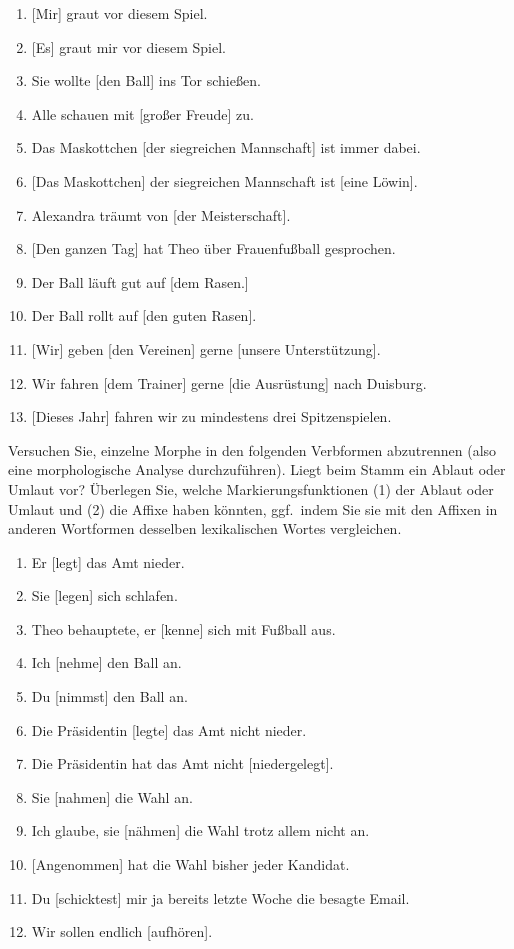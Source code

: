\begin{enumerate}\Lf
  \item {[Mir]} graut vor diesem Spiel.
  \item {[Es]} graut mir vor diesem Spiel.
  \item Sie wollte {[den Ball]} ins Tor schießen.
  \item Alle schauen mit {[großer Freude]} zu.
  \item Das Maskottchen {[der siegreichen Mannschaft]} ist immer dabei.
  \item {[Das Maskottchen]} der siegreichen Mannschaft ist {[eine Löwin]}.
  \item Alexandra träumt von {[der Meisterschaft]}.
  \item {[Den ganzen Tag]} hat Theo über Frauenfußball gesprochen.
  \item Der Ball läuft gut auf {[dem Rasen.]}
  \item Der Ball rollt auf {[den guten Rasen]}.
  \item {[Wir]} geben {[den Vereinen]} gerne {[unsere Unterstützung]}.
  \item Wir fahren {[dem Trainer]} gerne {[die Ausrüstung]} nach Duisburg.
  \item {[Dieses Jahr]} fahren wir zu mindestens drei Spitzenspielen.
\end{enumerate}

\Uebung[\tristar] \label{u62} Versuchen Sie, einzelne Morphe in den folgenden Verbformen abzutrennen (also eine morphologische Analyse durchzuführen).
Liegt beim Stamm ein Ablaut oder Umlaut vor?
Überlegen Sie, welche Markierungsfunktionen (1) der Ablaut oder Umlaut und (2) die Affixe haben könnten, ggf.\ indem Sie sie mit den Affixen in anderen Wortformen desselben lexikalischen Wortes vergleichen.

\begin{enumerate}\Lf
  \item Er {[legt]} das Amt nieder.
  \item Sie {[legen]} sich schlafen.
  \item Theo behauptete, er {[kenne]} sich mit Fußball aus.
  \item Ich {[nehme]} den Ball an.
  \item Du {[nimmst]} den Ball an.
  \item Die Präsidentin {[legte]} das Amt nicht nieder.
  \item Die Präsidentin hat das Amt nicht {[niedergelegt]}.
  \item Sie {[nahmen]} die Wahl an.
  \item Ich glaube, sie {[nähmen]} die Wahl trotz allem nicht an.
  \item {[Angenommen]} hat die Wahl bisher jeder Kandidat.
  \item Du {[schicktest]} mir ja bereits letzte Woche die besagte Email.
  \item Wir sollen endlich {[aufhören]}.
\end{enumerate}


